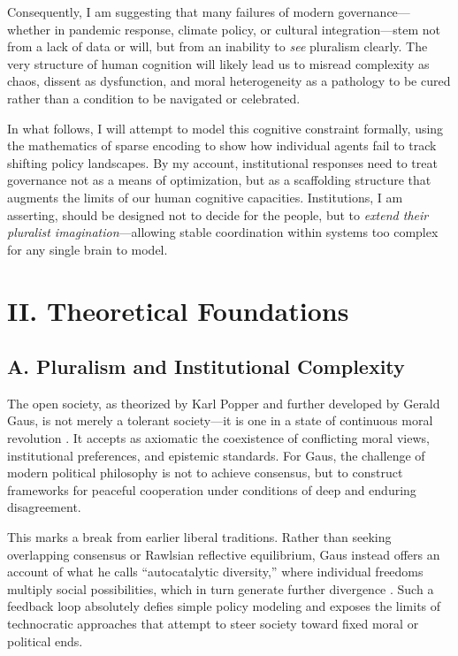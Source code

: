 \documentclass[12pt]{article}  %
\begin{document}
Consequently, I am suggesting that many failures of modern governance—whether in pandemic response, climate policy, or cultural integration—stem not from a lack of data or will, but from an inability to \textit{see} pluralism clearly. The very structure of human cognition will likely lead us to misread complexity as chaos, dissent as dysfunction, and moral heterogeneity as a pathology to be cured rather than a condition to be navigated or celebrated.

In what follows, I will attempt to model this cognitive constraint formally, using the mathematics of sparse encoding to show how individual agents fail to track shifting policy landscapes. By my account, institutional responses need to treat governance not as a means of optimization, but as a scaffolding structure that augments the limits of our human cognitive capacities. Institutions, I am asserting, should be designed not to decide for the people, but to \textit{extend their pluralist imagination}—allowing stable coordination within systems too complex for any single brain to model.

\section*{II. Theoretical Foundations}

\subsection*{A. Pluralism and Institutional Complexity}

The open society, as theorized by Karl Popper and further developed by Gerald Gaus, is not merely a tolerant society—it is one in a state of continuous moral revolution \parencite{gaus2021open, popper1945open}. It accepts as axiomatic the coexistence of conflicting moral views, institutional preferences, and epistemic standards. For Gaus, the challenge of modern political philosophy is not to achieve consensus, but to construct frameworks for peaceful cooperation under conditions of deep and enduring disagreement.

This marks a break from earlier liberal traditions. Rather than seeking overlapping consensus or Rawlsian reflective equilibrium, Gaus instead offers an account of what he calls “autocatalytic diversity,” where individual freedoms multiply social possibilities, which in turn generate further divergence \parencite{gaus2021open}. Such a feedback loop absolutely defies simple policy modeling and exposes the limits of technocratic approaches that attempt to steer society toward fixed moral or political ends.
\end{document}
